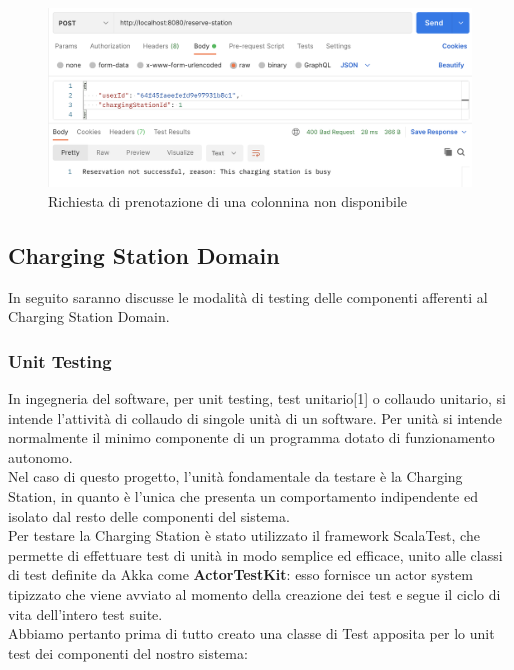 \begin{figure}[htbp]
    \centering
    \includegraphics[width=\textwidth]{images/reserveNotOk.png}
    \caption{Richiesta di prenotazione di una colonnina non disponibile}
    \label{fig:reserveNotOk}
\end{figure}

\subsection{Charging Station Domain}
In seguito saranno discusse le modalità di testing delle componenti afferenti al Charging Station Domain.\\

\subsubsection{Unit Testing}
In ingegneria del software, per unit testing, test unitario[1] o collaudo unitario, si intende l'attività di collaudo di singole unità di un software. Per unità si intende normalmente il minimo componente di un programma dotato di funzionamento autonomo.\\
Nel caso di questo progetto, l'unità fondamentale da testare è la Charging Station, in quanto è l'unica che presenta un comportamento indipendente ed isolato dal resto delle componenti del sistema.\\
Per testare la Charging Station è stato utilizzato il framework ScalaTest, che permette di effettuare test di unità in modo semplice ed efficace, unito alle classi di test definite da Akka come \textbf{ActorTestKit}: esso fornisce
un actor system tipizzato che viene avviato al momento della creazione dei test e segue il ciclo di vita dell'intero test suite.\\

Abbiamo pertanto prima di tutto creato una classe di Test apposita per lo unit test dei componenti del nostro sistema:

